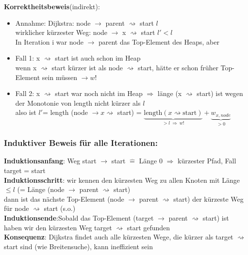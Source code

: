 \documentclass[11pt, fleqn]{scrreprt}
\begin{document}
		\textbf{Korrektheitsbeweis}(indirekt):
		\begin{itemize}
			\item Annahme: Dijkstra: node $\rightarrow$ parent $\rightsquigarrow$ start \hspace*{1.2cm} $l$\\
			wirklicher kürzester Weg: node $\rightarrow$ x $\rightsquigarrow$ start \hspace*{1cm} $l' < l$\\ 
			In Iteration i war node $\rightarrow$ parent das Top-Element des Heaps, aber
			\item Fall 1: x $\rightsquigarrow$ start ist auch schon im Heap \\
			wenn x $\rightsquigarrow$ start kürzer ist als node $\rightsquigarrow$ start, hätte er schon früher Top-Element sein müssen $\rightarrow w!$
			\item Fall 2: x $\rightsquigarrow$ start war noch nicht im Heap $\Rightarrow$ länge (x $\rightsquigarrow$ start) ist wegen der Monotonie von length nicht kürzer als $l$\\
			also ist $l'$= length (node $\rightarrow x \rightsquigarrow$ start) = $\underbrace{\text{length}(x \rightsquigarrow \text{start})}_{> l \  \Rightarrow \ w!} + \underbrace{w_{x, node}}_{>0}$
		\end{itemize}
		
		\subsubsection*{Induktiver Beweis für alle Iterationen:}
		\textbf{Induktionsanfang}: Weg start $\rightarrow$ start $\widehat{=}$ Länge 0 $\Rightarrow$ kürzester Pfad, Fall target = start\\
		
		\textbf{Induktionsschritt}: wir kennen den kürzesten Weg zu allen Knoten mit Länge $\leq l$ (= Länge (node $\rightarrow$ parent $\rightsquigarrow$ start)\\
		dann ist das nächste Top-Element (node $\rightarrow$ parent $\rightsquigarrow$ start) der kürzeste Weg für node $\rightsquigarrow$ start (s.o.) \\
		
		\textbf{Induktionsende}:Sobald das Top-Element (target $\rightarrow$ parent $\rightsquigarrow$ start) ist haben wir den kürzesten Weg target $\rightsquigarrow$ start gefunden\\
		
		\textbf{Konsequenz}: Dijkstra findet auch alle kürzesten Wege, die kürzer als target $\rightsquigarrow$ start sind (wie Breitensuche), kann ineffizient sein\\
		
\end{document}
